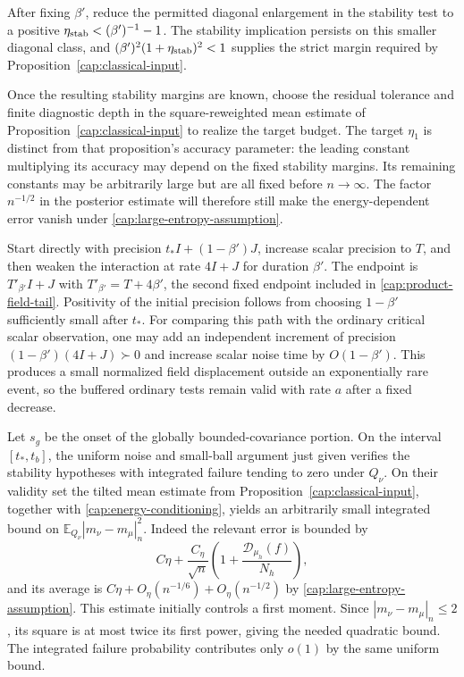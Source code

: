 After fixing $\beta'$, reduce the permitted diagonal enlargement in the
stability test to a positive $\eta_{\rm stab}<(\beta')^{-1}-1$. The
stability implication persists on this smaller diagonal class, and
$(\beta')^2(1+\eta_{\rm stab})^2<1$ supplies the strict margin required by
Proposition~\ref{cap:classical-input}.

Once the resulting stability margins are known, choose the residual tolerance
and finite diagnostic depth in the square-reweighted mean estimate of
Proposition~\ref{cap:classical-input} to realize the target budget. The target
$\eta_1$ is distinct from that proposition's accuracy parameter: the leading
constant multiplying its accuracy may depend on the fixed stability margins.
Its remaining constants may be arbitrarily large but are all fixed before
$n\to\infty$. The factor $n^{-1/2}$ in the posterior estimate will therefore
still make the energy-dependent error vanish under
\eqref{cap:large-entropy-assumption}.

Start directly with precision $t_*I+(1-\beta')J$, increase scalar precision to
$T$, and then weaken the interaction at rate $4I+J$ for duration $\beta'$.
The endpoint is $T'_{\beta'}I+J$ with $T'_{\beta'}=T+4\beta'$, the second
fixed endpoint included in \eqref{cap:product-field-tail}. Positivity of the initial
precision follows from choosing $1-\beta'$ sufficiently small after $t_*$. For comparing this path with
the ordinary critical scalar observation, one may add an independent increment
of precision $(1-\beta')(4I+J)\succ0$ and increase scalar noise time by
$O(1-\beta')$. This produces a small normalized field displacement outside an
exponentially rare event, so the buffered ordinary tests remain valid with
rate $a$ after a fixed decrease.

Let $s_g$ be the onset of the globally bounded-covariance portion. On the
interval $[t_*,t_b]$, the uniform noise and small-ball argument just given
verifies the stability hypotheses with integrated failure tending to zero
under $Q_\nu$. On their validity set the tilted mean estimate from
Proposition~\ref{cap:classical-input}, together with
\eqref{cap:energy-conditioning}, yields an arbitrarily small integrated bound
on $\mathbb E_{Q_\nu}|m_\nu-m_\mu|_n^2$. Indeed the relevant error is bounded
by
\[
 C\eta+\frac{C_\eta}{\sqrt n}
       \left(1+\frac{\mathcal D_{\mu_h}(f)}{N_h}\right),
\]
and its average is $C\eta+O_\eta(n^{-1/6})+O_\eta(n^{-1/2})$ by
\eqref{cap:large-entropy-assumption}. This estimate initially controls a
first moment. Since $|m_\nu-m_\mu|_n\le2$, its square is at most twice its
first power, giving the needed quadratic bound. The integrated failure probability contributes
only $o(1)$ by the same uniform bound.

